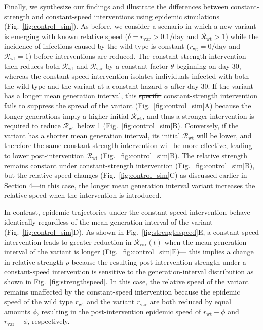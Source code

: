\documentclass[12pt]{article}
\newcommand{\fref}[1]{Fig.~\ref{fig:#1}}
\newcommand{\vvvar}{\mathrm{var}}
\newcommand{\wwwt}{\mathrm{wt}}
\newcommand{\rx}[1]{\ensuremath{{r}_{#1}}\xspace}
\newcommand{\rw}{\rx{\wwwt}}
\newcommand{\rv}{\rx{\vvvar}}
\newcommand{\Rx}[1]{\ensuremath{{\mathcal R}_{#1}}\xspace}
\newcommand{\Rw}{\Rx{\wwwt}}
\newcommand{\Rv}{\Rx{\vvvar}}
\newcommand{\pday}{\ensuremath{/\textrm{day}}}
\providecommand{\DIFaddtex}[1]{{\protect\color{blue}\uwave{#1}}} %
\providecommand{\DIFdeltex}[1]{{\protect\color{red}\sout{#1}}}                      %
\providecommand{\DIFaddbegin}{} %
\providecommand{\DIFaddend}{} %
\providecommand{\DIFdelbegin}{} %
\providecommand{\DIFdelend}{} %
\providecommand{\DIFadd}[1]{\texorpdfstring{\DIFaddtex{#1}}{#1}} %
\providecommand{\DIFdel}[1]{\texorpdfstring{\DIFdeltex{#1}}{}} %
\newcommand{\DIFscaledelfig}{0.5}
\newlength{\DIFdelgraphicswidth} %
\newlength{\DIFdelgraphicsheight} %
\newcommand{\DIFaddincludegraphics}[2][]{{\color{blue}\fbox{\DIFOincludegraphics[#1]{#2}}}} %
\newcommand{\DIFdelincludegraphics}[2][]{%
\sbox{\DIFdelgraphicsbox}{\DIFOincludegraphics[#1]{#2}}%
\settoboxwidth{\DIFdelgraphicswidth}{\DIFdelgraphicsbox} %
\settoboxtotalheight{\DIFdelgraphicsheight}{\DIFdelgraphicsbox} %
\scalebox{\DIFscaledelfig}{%
\parbox[b]{\DIFdelgraphicswidth}{\usebox{\DIFdelgraphicsbox}\\[-\baselineskip] \rule{\DIFdelgraphicswidth}{0em}}\llap{\resizebox{\DIFdelgraphicswidth}{\DIFdelgraphicsheight}{%
\setlength{\unitlength}{\DIFdelgraphicswidth}%
\begin{picture}(1,1)%
\thicklines\linethickness{2pt} %
{\color[rgb]{1,0,0}\put(0,0){\framebox(1,1){}}}%
{\color[rgb]{1,0,0}\put(0,0){\line( 1,1){1}}}%
{\color[rgb]{1,0,0}\put(0,1){\line(1,-1){1}}}%
\end{picture}%
}\hspace*{3pt}}} %
} %
\DeclareRobustCommand{\DIFaddbegin}{\DIFOaddbegin \let\includegraphics\DIFaddincludegraphics} %
\DeclareRobustCommand{\DIFaddend}{\DIFOaddend \let\includegraphics\DIFOincludegraphics} %
\DeclareRobustCommand{\DIFdelbegin}{\DIFOdelbegin \let\includegraphics\DIFdelincludegraphics} %
\DeclareRobustCommand{\DIFdelend}{\DIFOaddend \let\includegraphics\DIFOincludegraphics} %
\begin{document}
Finally, we synthesize our findings and illustrate the differences between constant-strength and constant-speed interventions using epidemic simulations (\fref{control_sim}).
As before, we consider a scenario in which a new variant is emerging with known relative speed ($\delta=\rv > 0.1\pday$ \DIFdelbegin \DIFdel{and }\DIFdelend \DIFaddbegin \DIFadd{$\implies$ }\DIFaddend $\Rw > 1$) while the incidence of infections caused by the wild type is constant ($\rw = 0\pday$ \DIFdelbegin \DIFdel{and }\DIFdelend \DIFaddbegin \DIFadd{$\implies$ }\DIFaddend $\Rw =1$) before interventions are \DIFdelbegin \DIFdel{reduced}\DIFdelend \DIFaddbegin \DIFadd{introduced}\DIFaddend .
The constant-strength intervention then reduces both $\Rw$ and $\Rv$ by a \DIFdelbegin \DIFdel{constant }\DIFdelend factor $\theta$ beginning on day 30, 
whereas the constant-speed intervention isolates individuals infected with both the wild type and the variant at a constant hazard $\phi$ after day 30.
If the variant has a longer mean generation interval, this \DIFdelbegin \DIFdel{specific }\DIFdelend \DIFaddbegin \DIFadd{particular }\DIFaddend constant-strength intervention fails to suppress the spread of the variant (\fref{control_sim}A) because the longer generations imply a higher initial $\Rw$, and thus a stronger intervention is required to reduce $\Rw$ below 1 (\fref{control_sim}B).
Conversely, if the variant has a shorter mean generation interval, its initial $\Rw$ will be lower, and therefore the same constant-strength intervention will be more effective, leading to lower post-intervention $\Rw$ (\fref{control_sim}B).
The relative strength remains constant under constant-strength intervention (\fref{control_sim}B), but the relative speed changes (\fref{control_sim}C) as discussed earlier in Section 4---in this case, the longer mean generation interval variant increases the relative speed when the intervention is introduced.

In contrast, epidemic trajectories under the constant-speed intervention behave identically regardless of the mean generation interval of the variant (\fref{control_sim}D). 
As shown in \fref{strengthspeed}E, a constant-speed intervention leads to greater reduction in $\Rv(t)$ when the mean generation-interval of the variant is longer (\fref{control_sim}E)---
this implies a change in relative strength $\rho$ because the resulting post-intervention strength under a constant-speed intervention is sensitive to the generation-interval distribution as shown in \fref{strengthspeed}.
In this case, the relative speed of the variant remains unaffected by the constant-speed intervention because the epidemic speed of the wild type $\rw$ and the variant $\rv$ are both reduced by equal amounts $\phi$, resulting in the post-intervention epidemic speed of $\rw-\phi$ and $\rv-\phi$, respectively. 
\end{document}
